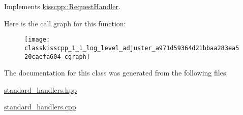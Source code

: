 Implements \hyperlink{classkisscpp_1_1_request_handler_a3606f772c07297826847a8e36226cdaa}{kisscpp\-::\-Request\-Handler}.



Here is the call graph for this function\-:
\nopagebreak
\begin{figure}[H]
\begin{center}
\leavevmode
\texttt{[image: classkisscpp\_1\_1\_log\_level\_adjuster\_a971d59364d21bbaa283ea520caefa604\_cgraph]}
\end{center}
\end{figure}




The documentation for this class was generated from the following files\-:\begin{DoxyCompactItemize}
\item 
\hyperlink{standard__handlers_8hpp}{standard\-\_\-handlers.\-hpp}\item 
\hyperlink{standard__handlers_8cpp}{standard\-\_\-handlers.\-cpp}\end{DoxyCompactItemize}
